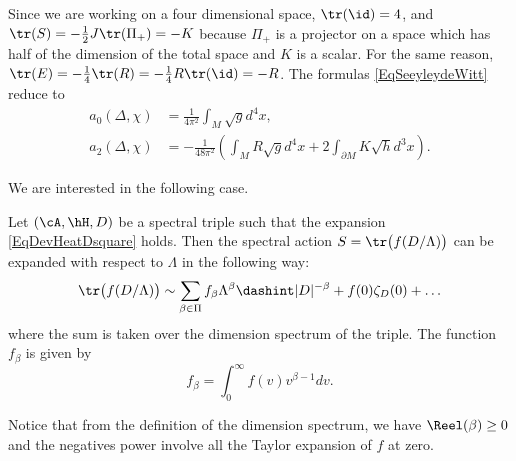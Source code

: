 Since we are working on a four dimensional space, $\tr(\id)=4$, and $\tr(S)=-\frac{ 1 }{2}J\tr(\Pi_+)=-K$ because $\Pi_+$ is a projector on a space which has half of the dimension of the total space and $K$ is a scalar. For the same reason, $\tr(E)=-\frac{ 1 }{ 4 }\tr(R)=-\frac{ 1 }{ 4 }R\tr(\id)=-R$. The formulas \eqref{EqSeeyleydeWitt} reduce to
\begin{subequations}
\begin{align}
a_0(\Delta,\chi)	&=\frac{1}{ 4\pi^2 }\int_M\sqrt{g}d^4x,\\
a_2(\Delta,\chi)	&=-\frac{1}{ 48\pi^2 }\left( \int_M R\sqrt{g}d^4x + 2\int_{\partial M}K\sqrt{h}d^3x \right).
\end{align}
\end{subequations}



We are interested in the following case.

\begin{theorem}			\label{ThoExpActSpect}
Let $(\cA,\hH,D)$ be a spectral triple such that the expansion \eqref{EqDevHeatDsquare} holds. Then the spectral action $S=\tr\big( f(D/\Lambda) \big)$ can be expanded with respect to $\Lambda$ in the following way:
\begin{equation}
\tr\big( f(D/\Lambda) \big)\sim\sum_{\beta\in\Pi}f_{\beta}\Lambda^{\beta}\dashint| D |^{-\beta}+f(0)\zeta_D(0)+\ldots
\end{equation}
where the sum is taken over the dimension spectrum of the triple. The function $f_{\beta}$ is given by
\begin{equation}			\label{Eqfbetaintdonne}
  f_{\beta}=\int_0^{\infty}f(v)v^{\beta-1}dv.
\end{equation}
\end{theorem}

Notice that from the definition of the dimension spectrum, we have $\Reel(\beta)\geq 0$ and the negatives power involve all the Taylor expansion of $f$ at zero.

